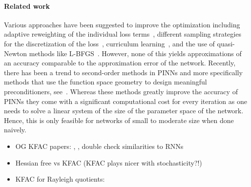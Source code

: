 \paragraph{Related work}
Various approaches have been suggested to improve the optimization including adaptive reweighting of the individual loss terms~\citep{wang2021understanding,van2022optimally,wang2022and}, different sampling strategies for the discretization of the loss~\citep{lu2021deepxde, nabian2021efficient, daw2022rethinking,zapf2022investigating, wang2022respecting, wu2023comprehensive}, curriculum learning~\citep{wang2022respecting, krishnapriyan2021characterizing}, and the use of quasi-Newton methods like L-BFGS~\citep{markidis2021old}. 
However, none of this yields approximations of an accuracy comparable to the approximation error of the network. 
Recently, there has been a trend to second-order methods in PINNs and more specifically methods that use the function space geometry to design meaningful preconditioners, see~\citep{zeng2022competitive, muller2023achieving, de2023operator, liu2024preconditioning}. 
Whereas these methods greatly improve the accuracy of PINNs they come with a significant computational cost for every iteration as one needs to solve a linear system of the size of the parameter space of the network. 
Hence, this is only feasible for networks of small to moderate size when done naively.
\begin{itemize}
    \item OG KFAC papers: \cite{martens2015optimizing}, \cite{martens2018kroneckerfactored}, double check similarities to RNNs
    \item Hessian free vs KFAC (KFAC plays nicer with stochasticity?!)
    \item KFAC for Rayleigh quotients:
\end{itemize}

